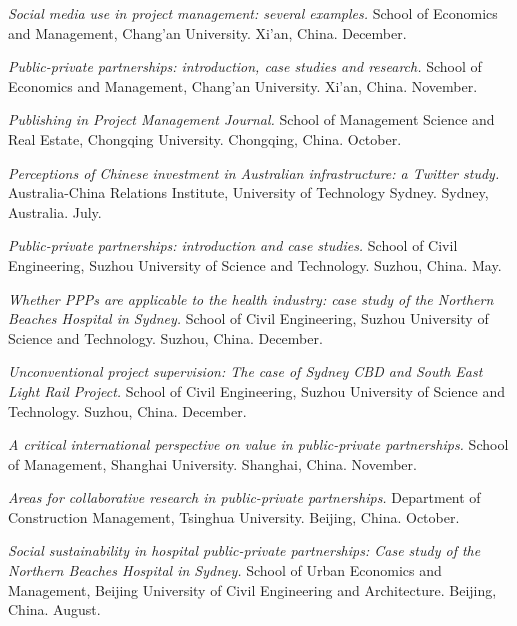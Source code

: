 \documentclass[11pt,a4paper]{report} %
\begin{document}
\begin{tablist}
        \item[2022] \tab{}\textit{Social media use in project management: several examples.} School of Economics and Management, Chang'an University. Xi'an, China. December.
        
        \item[2022] \tab{}\textit{Public-private partnerships: introduction, case studies and research.} School of Economics and Management, Chang'an University. Xi'an, China. November.
        
        \item[2022] \tab{}\textit{Publishing in \textit{Project Management Journal}.} School of Management Science and Real Estate, Chongqing University. Chongqing, China. October.
        
        \item[2022] \tab{}\textit{Perceptions of Chinese investment in Australian infrastructure: a Twitter study.} Australia-China Relations Institute, University of Technology Sydney. Sydney, Australia. July.
        
        \item[2022] \tab{}\textit{Public-private partnerships: introduction and case studies.} School of Civil Engineering, Suzhou University of Science and Technology. Suzhou, China. May.
        
        \item[2021] \tab{}\textit{Whether PPPs are applicable to the health industry: case study of the Northern Beaches Hospital in Sydney.} School of Civil Engineering, Suzhou University of Science and Technology. Suzhou, China. December.
        
        \item[2020] \tab{}\textit{Unconventional project supervision: The case of Sydney CBD and South East Light Rail Project.} School of Civil Engineering, Suzhou University of Science and Technology. Suzhou, China. December.
        
        \item[2020] \tab{}\textit{A critical international perspective on value in public-private partnerships.} School of Management, Shanghai University. Shanghai, China. November.
        
        \item[2020] \tab{}\textit{Areas for collaborative research in public-private partnerships.} Department of Construction Management, Tsinghua University. Beijing, China. October.
        
        \item[2020] \tab{}\textit{Social sustainability in hospital public-private partnerships: Case study of the Northern Beaches Hospital in Sydney.} School of Urban Economics and Management, Beijing University of Civil Engineering and Architecture. Beijing, China. August.
        

\end{tablist}
\end{document}

